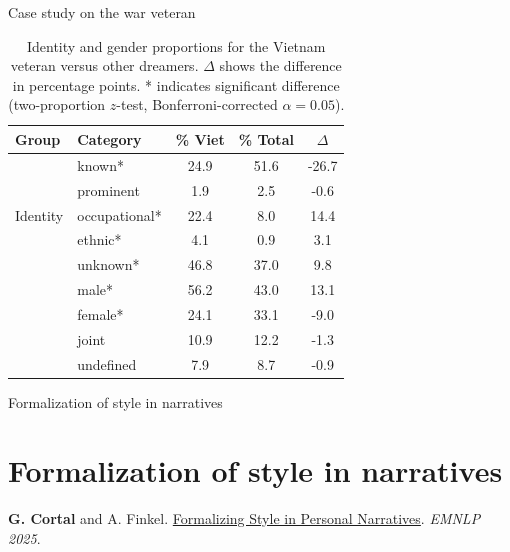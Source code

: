 \documentclass[handout,10pt]{beamer}
\begin{document}
\begin{frame}{Case study on the war veteran}
  \begin{table}
    \centering
    \begin{tabular}{llccc}
\textbf{Group} & \textbf{Category} & \textbf{\% Viet} & \textbf{\% Total} & \textbf{$\Delta$} \\
\midrule
\multirow{5}{*}{Identity} & known* & 24.9 & 51.6 & -26.7 \\
& prominent & 1.9 & 2.5 & -0.6 \\
& occupational* & 22.4 & 8.0 & 14.4 \\
& ethnic* & 4.1 & 0.9 & 3.1 \\
& unknown* & 46.8 & 37.0 & 9.8 \\
\addlinespace
\multirow{4}{*}{Gender} & male* & 56.2 & 43.0 & 13.1 \\
& female* & 24.1 & 33.1 & -9.0 \\
& joint & 10.9 & 12.2 & -1.3 \\
& undefined & 7.9 & 8.7 & -0.9 \\
\end{tabular}
\caption{Identity and gender proportions for the Vietnam veteran versus other dreamers. $\Delta$ shows the difference in percentage points. * indicates significant difference (two-proportion $z$-test, Bonferroni-corrected $\alpha=0.05$).}
\label{tab:case_study_war_veteran}
\end{table}
\end{frame}


\begin{frame}{}
\Large
\begin{center}
    Formalization of style in narratives
    \section{Formalization of style in narratives}
\end{center}

\vspace{1.5cm}

\footnotesize

\textbf{G. Cortal} and A. Finkel. \href{https://gustavecortal.com/data/Formalizing_Style_in_Personal_Narratives.pdf}{Formalizing Style in Personal Narratives}. \textit{EMNLP 2025}.
\end{frame}
\end{document}
